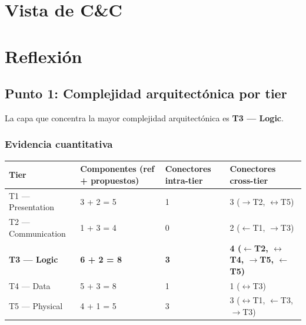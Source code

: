 \documentclass[a4paper, 10 pt]{article}
\begin{document}
\section{Vista de C\&C}


\section{Reflexión}

\subsection{Punto 1: Complejidad arquitectónica por tier}

La capa que concentra la mayor complejidad arquitectónica es \textbf{T3 --- Logic}.

\subsubsection{Evidencia cuantitativa}

\begin{table}[H]
\centering
\footnotesize
\begin{tabular}{|R{0.2\textwidth}|M{0.2\textwidth}|M{0.18\textwidth}|M{0.22\textwidth}|}
\hline
\textbf{Tier} & \textbf{Componentes (ref + propuestos)} & \textbf{Conectores intra-tier} & \textbf{Conectores cross-tier} \\
\hline
T1 --- Presentation & 3 + 2 = 5 & 1 & 3 ($\rightarrow$T2, $\leftrightarrow$T5) \\
\hline
T2 --- Communication & 1 + 3 = 4 & 0 & 2 ($\leftarrow$T1, $\rightarrow$T3) \\
\hline
\textbf{T3 --- Logic} & \textbf{6 + 2 = 8} & \textbf{3} & \textbf{4 ($\leftarrow$T2, $\leftrightarrow$T4, $\rightarrow$T5, $\leftarrow$T5)} \\
\hline
T4 --- Data & 5 + 3 = 8 & 1 & 1 ($\leftrightarrow$T3) \\
\hline
T5 --- Physical & 4 + 1 = 5 & 3 & 3 ($\leftrightarrow$T1, $\leftarrow$T3, $\rightarrow$T3) \\
\hline
\end{tabular}
\end{table}
\end{document}
